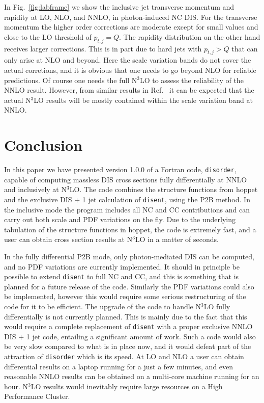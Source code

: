 \documentclass[submission, PhysCodeb]{SciPost}
\newcommand{\hoppet}{{\sc hoppet}}
\newcommand{\disent}{{\tt disent}}
\newcommand{\disorder}{{\tt disorder}}
\newcommand{\NNNLO}{N$^3$LO}
\begin{document}
In Fig.~\ref{fig:labframe} we show the inclusive jet transverse
momentum and rapidity at LO, NLO, and NNLO, in photon-induced NC
DIS. For the transverse momentum the higher order corrections are
moderate except for small values and close to the LO threshold of
$p_{t,j}=Q$. The rapidity distribution on the other hand receives
larger corrections. This is in part due to hard jets with $p_{t,j}>Q$
that can only arise at NLO and beyond. Here the scale variation bands
do not cover the actual corretions, and it is obvious that one needs
to go beyond NLO for reliable predictions. Of course one needs the
full \NNNLO{} to assess the reliability of the NNLO result. However,
from similar results in Ref.~\cite{Currie:2018fgr} it can be expected
that the actual \NNNLO{} results will be mostly contained within the
scale variation band at NNLO.

\section{Conclusion}
\label{sec:conclusion}
In this paper we have presented version 1.0.0 of a Fortran code,
\disorder{}, capable of computing massless DIS cross sections fully
differentially at NNLO and inclusively at \NNNLO{}. The code combines
the structure functions from \hoppet{} and the exclusive DIS + 1 jet
calculation of \disent{}, using the P2B method. In the inclusive mode
the program includes all NC and CC contributions and can carry out
both scale and PDF variations on the fly. Due to the underlying
tabulation of the structure functions in \hoppet{}, the code is
extremely fast, and a user can obtain cross section results at
\NNNLO{} in a matter of seconds.

In the fully differential P2B mode, only photon-mediated DIS can be
computed, and no PDF variations are currently implemented. It should
in principle be possible to extend \disent{} to full NC and CC, and
this is something that is planned for a future release of the
code. Similarly the PDF variations could also be implemented, however
this would require some serious restructuring of the code for it to be
efficient. The upgrade of the code to handle \NNNLO{} fully
differentially is not currently planned. This is mainly due to the
fact that this would require a complete replacement of \disent{} with
a proper exclusive NNLO DIS + 1 jet code, entailing a significant
amount of work. Such a code would also be very slow compared to what
is in place now, and it would defeat part of the attraction of
\disorder{} which is its speed. At LO and NLO a user can obtain
differential results on a laptop running for a just a few minutes, and
even reasonable NNLO results can be obtained on a multi-core machine
running for an hour. \NNNLO{} results would inevitably require
large resources on a High Performance Cluster.
\end{document}
